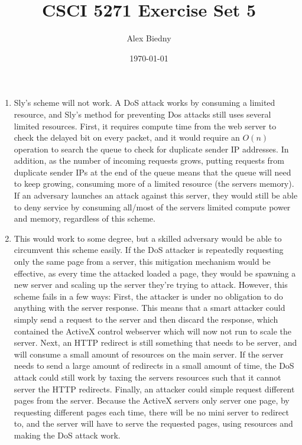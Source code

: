 \documentclass{jhwhw}
\title{CSCI 5271 Exercise Set 5}
\author{Alex Biedny}
\date{\today}
\begin{document}
\maketitle

\begin{enumerate}
\item Sly's scheme will not work. A DoS attack works by consuming a limited resource, and Sly's method for preventing Dos attacks still uses several limited resources. First, it requires compute time from the web server to check the delayed bit on every packet, and it would require an $O(n)$ operation to search the queue to check for duplicate sender IP addresses. In addition, as the number of incoming requests grows, putting requests from duplicate sender IPs at the end of the queue means that the queue will need to keep growing, consuming more of a limited resource (the servers memory). If an adversary launches an attack against this server, they would still be able to deny service by consuming all/most of the servers limited compute power and memory, regardless of this scheme.
\item This would work to some degree, but a skilled adversary would be able to circumvent this scheme easily. If the DoS attacker is repeatedly requesting only the same page from a server, this mitigation mechanism would be effective, as every time the attacked loaded a page, they would be spawning a new server and scaling up the server they're trying to attack. However, this scheme fails in a few ways: First, the attacker is under no obligation to do anything with the server response. This means that a smart attacker could simply send a request to the server and then discard the response, which contained the ActiveX control webserver which will now not run to scale the server. Next, an HTTP redirect is still something that needs to be server, and will consume a small amount of resources on the main server. If the server needs to send a large amount of redirects in a small amount of time, the DoS attack could still work by taxing the servers resources such that it cannot server the HTTP redirects. Finally, an attacker could simple request different pages from the server. Because the ActiveX servers only server one page, by requesting different pages each time, there will be no mini server to redirect to, and the server will have to serve the requested pages, using resources and making the DoS attack work.
\end{enumerate}
\end{document}
